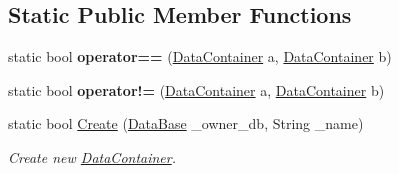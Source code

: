 \subsection*{Static Public Member Functions}
\begin{DoxyCompactItemize}
\item 
\hypertarget{class_dwarf_d_b_1_1_data_structures_1_1_data_container_a7a47a45e62754b629dc06c57438a4eca}{
static bool {\bfseries operator==} (\hyperlink{class_dwarf_d_b_1_1_data_structures_1_1_data_container}{DataContainer} a, \hyperlink{class_dwarf_d_b_1_1_data_structures_1_1_data_container}{DataContainer} b)}
\label{class_dwarf_d_b_1_1_data_structures_1_1_data_container_a7a47a45e62754b629dc06c57438a4eca}

\item 
\hypertarget{class_dwarf_d_b_1_1_data_structures_1_1_data_container_aa59ee6235912ea37a590efe9a147b704}{
static bool {\bfseries operator!=} (\hyperlink{class_dwarf_d_b_1_1_data_structures_1_1_data_container}{DataContainer} a, \hyperlink{class_dwarf_d_b_1_1_data_structures_1_1_data_container}{DataContainer} b)}
\label{class_dwarf_d_b_1_1_data_structures_1_1_data_container_aa59ee6235912ea37a590efe9a147b704}

\item 
static bool \hyperlink{class_dwarf_d_b_1_1_data_structures_1_1_data_container_a57324435e4d7961b4b875588b9a86f3d}{Create} (\hyperlink{class_dwarf_d_b_1_1_data_structures_1_1_data_base}{DataBase} \_\-owner\_\-db, String \_\-name)
\begin{DoxyCompactList}\small\item\em Create new \hyperlink{class_dwarf_d_b_1_1_data_structures_1_1_data_container}{DataContainer}. \item\end{DoxyCompactList}\end{DoxyCompactItemize}

